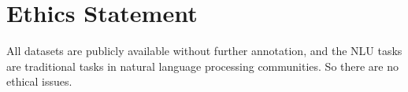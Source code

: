 \section*{Ethics Statement}

All datasets are publicly available without further annotation, and the NLU tasks are traditional tasks in natural language processing communities.
So there are no ethical issues.
